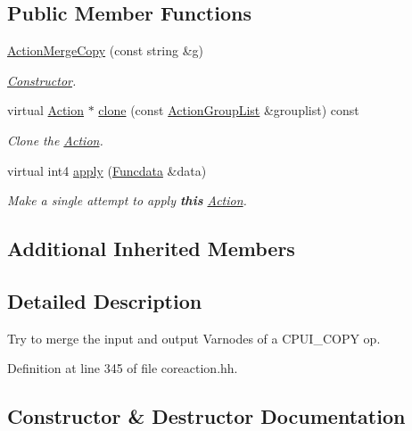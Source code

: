 \subsection*{Public Member Functions}
\begin{DoxyCompactItemize}
\item 
\mbox{\hyperlink{class_action_merge_copy_a4640af5b1b6128bc2468f71ac579545d}{Action\+Merge\+Copy}} (const string \&g)
\begin{DoxyCompactList}\small\item\em \mbox{\hyperlink{class_constructor}{Constructor}}. \end{DoxyCompactList}\item 
virtual \mbox{\hyperlink{class_action}{Action}} $\ast$ \mbox{\hyperlink{class_action_merge_copy_afb28234f727a499cda6e1531f348cdef}{clone}} (const \mbox{\hyperlink{class_action_group_list}{Action\+Group\+List}} \&grouplist) const
\begin{DoxyCompactList}\small\item\em Clone the \mbox{\hyperlink{class_action}{Action}}. \end{DoxyCompactList}\item 
virtual int4 \mbox{\hyperlink{class_action_merge_copy_a363eedc3ead59931897e73fb55a31a0e}{apply}} (\mbox{\hyperlink{class_funcdata}{Funcdata}} \&data)
\begin{DoxyCompactList}\small\item\em Make a single attempt to apply {\bfseries{this}} \mbox{\hyperlink{class_action}{Action}}. \end{DoxyCompactList}\end{DoxyCompactItemize}
\subsection*{Additional Inherited Members}


\subsection{Detailed Description}
Try to merge the input and output Varnodes of a C\+P\+U\+I\+\_\+\+C\+O\+PY op. 

Definition at line 345 of file coreaction.\+hh.



\subsection{Constructor \& Destructor Documentation}
\mbox{\label{class_action_merge_copy_a4640af5b1b6128bc2468f71ac579545d}} 
